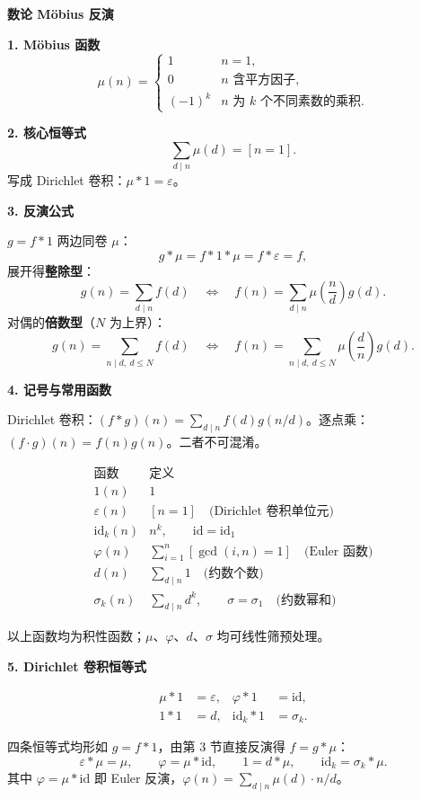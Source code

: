 \textbf{数论 Möbius 反演}

\textbf{1. Möbius 函数}
\[
\mu(n)=
\begin{cases}
1 & n=1,\\
0 & n\text{ 含平方因子},\\
(-1)^k & n\text{ 为 }k\text{ 个不同素数的乘积}.
\end{cases}
\]

\textbf{2. 核心恒等式}
\[
\sum_{d\mid n}\mu(d)=[n=1].
\]
写成 Dirichlet 卷积：$\mu * 1 = \varepsilon$。

\textbf{3. 反演公式}

$g = f * 1$ 两边同卷 $\mu$：
\[
g * \mu = f * 1 * \mu = f * \varepsilon = f,
\]
展开得\textbf{整除型}：
\[
g(n)=\sum_{d\mid n}f(d)
\quad\Longleftrightarrow\quad
f(n)=\sum_{d\mid n}\mu\!\left(\frac{n}{d}\right)g(d).
\]
对偶的\textbf{倍数型}（$N$ 为上界）：
\[
g(n)=\sum_{n\mid d,\ d\le N}f(d)
\quad\Longleftrightarrow\quad
f(n)=\sum_{n\mid d,\ d\le N}\mu\!\left(\frac{d}{n}\right)g(d).
\]

\textbf{4. 记号与常用函数}

Dirichlet 卷积：$(f*g)(n)=\sum_{d\mid n}f(d)g(n/d)$。逐点乘：$(f\cdot g)(n)=f(n)g(n)$。二者不可混淆。

\[
\begin{array}{c|c}
\text{函数} & \text{定义} \\ \hline
1(n)      & 1 \\
\varepsilon(n) & [n=1] \quad\text{(Dirichlet 卷积单位元)} \\
\text{id}_k(n) & n^k,\qquad \text{id}=\text{id}_1 \\
\varphi(n)& \sum_{i=1}^n[\gcd(i,n)=1] \quad\text{(Euler 函数)} \\
d(n)      & \sum_{d\mid n}1 \quad\text{(约数个数)} \\
\sigma_k(n) & \sum_{d\mid n}d^k,\qquad \sigma=\sigma_1 \quad\text{(约数幂和)}
\end{array}
\]

以上函数均为积性函数；$\mu$、$\varphi$、$d$、$\sigma$ 均可线性筛预处理。

\textbf{5. Dirichlet 卷积恒等式}

\[
\begin{aligned}
\mu * 1 &= \varepsilon, &
\varphi * 1 &= \text{id}, \\
1 * 1   &= d, &
\text{id}_k * 1 &= \sigma_k.
\end{aligned}
\]

四条恒等式均形如 $g = f * 1$，由第 3 节直接反演得 $f = g * \mu$：
\[
\varepsilon * \mu = \mu,\qquad
\varphi = \mu * \text{id},\qquad
1 = d * \mu,\qquad
\text{id}_k = \sigma_k * \mu.
\]
其中 $\varphi = \mu * \text{id}$ 即 Euler 反演，$\varphi(n)=\sum_{d\mid n}\mu(d)\cdot n/d$。

